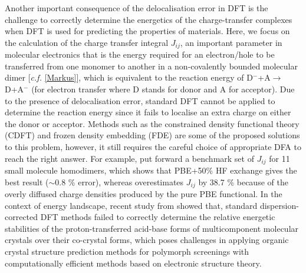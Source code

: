 Another important consequence of the delocalisation error in DFT is the challenge to correctly determine the energetics of the charge-transfer complexes when DFT is used for predicting the properties of materials. Here, we focus on the calculation of the charge transfer integral $J_{ij}$, an important parameter in molecular electronics that is the energy required for an electron/hole to be transferred from one monomer to another in a non-covalently bounded molecular dimer [\emph{c.f.} \cref{Markus}], which is equivalent to the reaction energy of D$^{-}$+A$\to$D+A$^{-}$ (for electron transfer where D stands for donor and A for acceptor). Due to the presence of delocalisation error, standard DFT cannot be applied to determine the reaction energy since it fails to localise an extra charge on either the donor or acceptor. Methods such as the constrained density functional theory (CDFT)\cite{wu2006extracting} and frozen density embedding (FDE)\cite{pavanello2011modelling} are some of the proposed solutions to this problem, however, it still requires the careful choice of appropriate DFA to reach the right answer. For example, \citet{kubas2014electronic} put forward a benchmark set of $J_{ij}$ for 11 small molecule homodimers, which shows that PBE+50\% HF exchange gives the best result ($\sim 0.8$ \% error), whereas overestimates $J_{ij}$ by 38.7 \% because of the overly diffused charge densities produced by the pure PBE functional. In the context of energy landscape, recent study from \citet{leblanc2018pervasive} showed that, standard dispersion-corrected DFT methods failed to correctly determine the relative energetic stabilities of the proton-transferred acid-base forms of multicomponent molecular crystals over their co-crystal forms, which poses challenges in applying organic crystal structure prediction methods\cite{reilly2016report,Hunnisett:aw5093,Hunnisett:aw5094} for polymorph screenings with computationally efficient methods based on electronic structure theory. 


